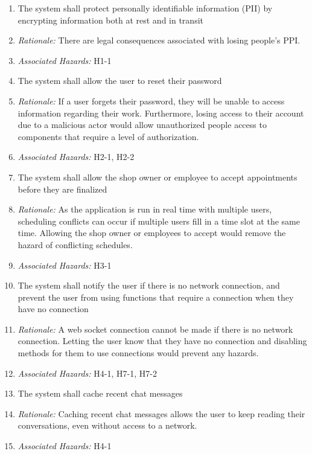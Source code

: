 \documentclass{article}
\begin{document}
\begin{enumerate}[label=SR\arabic*.]
	\item The system shall protect personally identifiable information (PII) by encrypting information both
	      at rest and in transit
	\item[] \emph{Rationale:} There are legal consequences associated with losing people's PPI.
	\item[] \emph{Associated Hazards:} H1-1 \\

	\item The system shall allow the user to reset their password
	\item[] \emph{Rationale:} If a user forgets their password, they will be unable to access information
		regarding their work. Furthermore, losing access to their account due to a malicious actor would
		allow unauthorized people access to components that require a level of authorization.
	\item[] \emph{Associated Hazards:} H2-1, H2-2 \\

	\item The system shall allow the shop owner or employee to accept appointments before they are finalized
	\item[] \emph{Rationale:} As the application is run in real time with multiple users, scheduling conflicts
		can occur if multiple users fill in a time slot at the same time. Allowing the shop owner or employees
		to accept would remove the hazard of conflicting schedules.
	\item[] \emph{Associated Hazards:} H3-1 \\

	\item The system shall notify the user if there is no network connection, and prevent the user from using
	      functions that require a connection when they have no connection
	\item[] \emph{Rationale:} A web socket connection cannot be made if there is no network connection.
		Letting the user know that they have no connection and disabling methods for them to use connections
		would prevent any hazards.
	\item[] \emph{Associated Hazards:} H4-1, H7-1, H7-2 \\

	\item The system shall cache recent chat messages
	\item[] \emph{Rationale:} Caching recent chat messages allows the user to keep reading their conversations,
		even without access to a network.
	\item[] \emph{Associated Hazards:} H4-1 \\


\end{enumerate}
\end{document}
